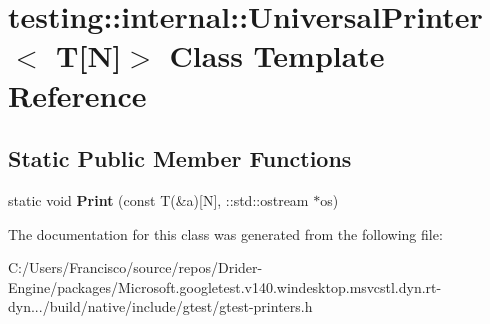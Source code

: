 \hypertarget{classtesting_1_1internal_1_1_universal_printer_3_01_t[_n]_4}{}\section{testing\+:\+:internal\+:\+:Universal\+Printer$<$ T\mbox{[}N\mbox{]}$>$ Class Template Reference}
\label{classtesting_1_1internal_1_1_universal_printer_3_01_t[_n]_4}
\subsection*{Static Public Member Functions}
\begin{DoxyCompactItemize}
\item 
\mbox{\label{classtesting_1_1internal_1_1_universal_printer_3_01_t[_n]_4_a1cf0e7c8db59c090f769116c6421b212}} 
static void {\bfseries Print} (const T(\&a)\mbox{[}N\mbox{]}, \+::std\+::ostream $\ast$os)
\end{DoxyCompactItemize}


The documentation for this class was generated from the following file\+:\begin{DoxyCompactItemize}
\item 
C\+:/\+Users/\+Francisco/source/repos/\+Drider-\/\+Engine/packages/\+Microsoft.\+googletest.\+v140.\+windesktop.\+msvcstl.\+dyn.\+rt-\/dyn.../build/native/include/gtest/gtest-\/printers.\+h\end{DoxyCompactItemize}
